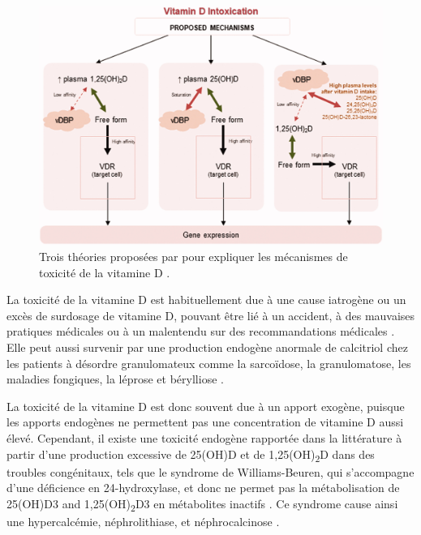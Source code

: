 \documentclass[
  a4paper,
  DIV=11,
  numbers=noendperiod,
  listof=totoc]{scrreprt}
\begin{document}
\begin{figure}

{\centering \includegraphics{figures/vd-intox-theory.jpg}

}

\caption[Trois théories proposées par \textcite{Jones.2008} pour
expliquer les mécanismes de toxicité de la vitamine
D.]{\label{fig-vd-intox-theory}Trois théories proposées par
\textcite{Jones.2008} pour expliquer les mécanismes de toxicité de la
vitamine D \autocite{Janoušek.2022}.}

\end{figure}

La toxicité de la vitamine D est habituellement due à une cause
iatrogène ou un excès de surdosage de vitamine D, pouvant être lié à un
accident, à des mauvaises pratiques médicales ou à un malentendu sur des
recommandations médicales \autocite{Lim.2020vd}. Elle peut aussi
survenir par une production endogène anormale de calcitriol chez les
patients à désordre granulomateux comme la sarcoïdose, la granulomatose,
les maladies fongiques, la léprose et bérylliose
\autocite{Marcinowska-Suchowierska.2018}.

La toxicité de la vitamine D est donc souvent due à un apport exogène,
puisque les apports endogènes ne permettent pas une concentration de
vitamine D aussi élevé. Cependant, il existe une toxicité endogène
rapportée dans la littérature à partir d'une production excessive de
25(OH)D et de 1,25(OH)\textsubscript{2}D dans des troubles congénitaux,
tels que le syndrome de Williams-Beuren, qui s'accompagne d'une
déficience en 24-hydroxylase, et donc ne permet pas la métabolisation de
25(OH)D3 and 1,25(OH)\textsubscript{2}D3 en métabolites inactifs
\autocite{Marcinowska-Suchowierska.2018}. Ce syndrome cause ainsi une
hypercalcémie, néphrolithiase, et néphrocalcinose \autocite{Azer.2021}.
\end{document}
